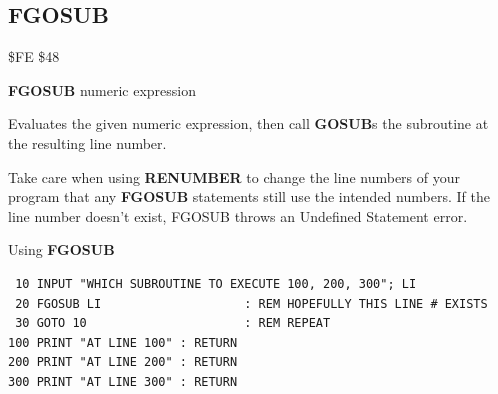 \newpage
\subsection{FGOSUB}
\begin{description}[leftmargin=2cm,style=nextline]
\item [Token:]    \$FE \$48

\item [Format:]   {\bf FGOSUB} numeric expression

\item [Usage:]    Evaluates the given numeric expression, then call {\bf GOSUB}s the subroutine at the resulting line number.

\item [Remarks:]  Take care when using {\bf RENUMBER} to change the line numbers of your program that any {\bf FGOSUB} statements still use the intended numbers. If the line number doesn't exist, FGOSUB throws an Undefined Statement error.

\item [Example:]  Using {\bf FGOSUB}

\begin{tcolorbox}[colback=black,coltext=white]
\verbatimfont{\codefont}
\begin{verbatim}
 10 INPUT "WHICH SUBROUTINE TO EXECUTE 100, 200, 300"; LI
 20 FGOSUB LI                    : REM HOPEFULLY THIS LINE # EXISTS
 30 GOTO 10                      : REM REPEAT
100 PRINT "AT LINE 100" : RETURN
200 PRINT "AT LINE 200" : RETURN
300 PRINT "AT LINE 300" : RETURN
\end{verbatim}
\end{tcolorbox}
\end{description}


\newpage
